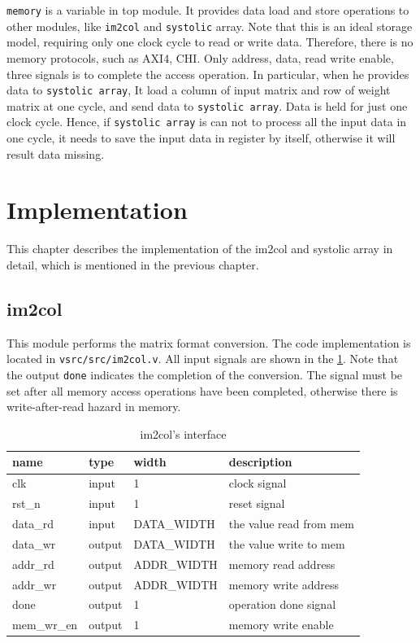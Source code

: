 \documentclass[conference]{IEEEtran}
\begin{document}
\verb|memory| is a variable in top module.
It provides data load and store operations to other modules,
like \verb|im2col| and \verb|systolic| array.
Note that this is an ideal storage model,
requiring only one clock cycle to read or write data.
Therefore, there is no memory protocols, such as AXI4, CHI.
Only address, data, read write enable, three signals is to complete the access operation.
In particular, when he provides data to \verb|systolic array|,
It load a column of input matrix and row of weight matrix at one cycle,
and send data to \verb|systolic array|.
Data is held for just one clock cycle.
Hence, if \verb|systolic array| is can not to process all the input data in one cycle,
it needs to save the input data in register by itself, otherwise it will result data missing.

\section{Implementation}

This chapter describes the implementation of the im2col and systolic array in detail,
which is mentioned in the previous chapter.

\subsection{im2col}
This module performs the matrix format conversion.
The code implementation is located in \verb|vsrc/src/im2col.v|.
All input signals are shown in the \ref{tab:im2col_if}.
Note that the output \verb|done| indicates the completion of the conversion.
The signal must be set after all memory access operations have been completed,
otherwise there is write-after-read hazard in memory.

\begin{table}[ht]
    \caption{im2col's interface}
    \centering
    \begin{tabular}{|l|l|l|l|}
        \hline
        \textbf{name} & \textbf{type} & \textbf{width} & \textbf{description}    \\ \hline
        clk           & input         & 1              & clock signal            \\ \hline
        rst\_n        & input         & 1              & reset signal            \\ \hline
        data\_rd      & input         & DATA\_WIDTH    & the value read from mem \\ \hline
        data\_wr      & output        & DATA\_WIDTH    & the value write to mem  \\ \hline
        addr\_rd      & output        & ADDR\_WIDTH    & memory read address     \\ \hline
        addr\_wr      & output        & ADDR\_WIDTH    & memory write address    \\ \hline
        done          & output        & 1              & operation done signal   \\ \hline
        mem\_wr\_en   & output        & 1              & memory write enable     \\ \hline
    \end{tabular}
    \label{tab:im2col_if}
\end{table}
\end{document}
